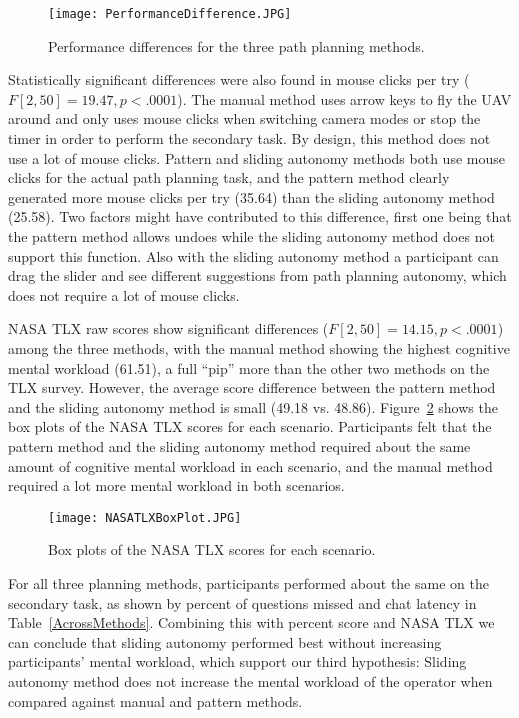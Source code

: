 \begin{figure}
\centering
\texttt{[image: PerformanceDifference.JPG]}
\caption{Performance differences for the three path planning methods.}
\label{PerformanceDifference}
\end{figure}

Statistically significant differences were also found in mouse clicks per try ($F[2,50]=19.47, p<.0001$). The manual method uses arrow keys to fly the UAV around and only uses mouse clicks when switching camera modes or stop the timer in order to perform the secondary task. By design, this method does not use a lot of mouse clicks. Pattern and sliding autonomy methods both use mouse clicks for the actual path planning task, and the pattern method clearly generated more mouse clicks per try (35.64) than the sliding autonomy method (25.58). Two factors might have contributed to this difference, first one being that the pattern method allows undoes while the sliding autonomy method does not support this function. Also with the sliding autonomy method a participant can drag the slider and see different suggestions from path planning autonomy, which does not require a lot of mouse clicks.

NASA TLX raw scores show significant differences ($F[2,50]=14.15, p<.0001$) among the three methods, with the manual method showing the highest cognitive mental workload (61.51), a full ``pip'' more than the other two methods on the TLX survey. However, the average score difference between the pattern method and the sliding autonomy method is small (49.18 vs. 48.86). Figure~\ref{NASATLX} shows the box plots of the NASA TLX scores for each scenario. Participants felt that the pattern method and the sliding autonomy method required about the same amount of cognitive mental workload in each scenario, and the manual method required a lot more mental workload in both scenarios.

\begin{figure}
\centering
\texttt{[image: NASATLXBoxPlot.JPG]}
\caption{Box plots of the NASA TLX scores for each scenario.}
\label{NASATLX}
\end{figure}

For all three planning methods, participants performed about the same on the secondary task, as shown by percent of questions missed and chat latency in Table~\ref{AcrossMethods}. Combining this with percent score and NASA TLX we can conclude that sliding autonomy performed best without increasing participants' mental workload, which support our third hypothesis: Sliding autonomy method does not increase the mental workload of the operator when compared against manual and pattern methods.

